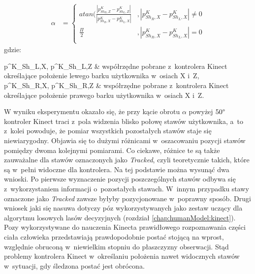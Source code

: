 \begin{equation}
	\label{eq:characteristics:kinect:bodyRotationAngle}
	\begin{split}
		\alpha &= 
		\begin{cases} 
			atan(\frac{|p^K_{{Sh}_R,Z} - p^K_{{Sh}_L,Z}|}{|p^K_{{Sh}_R,X} - p^K_{{Sh}_L,X}|} & , |p^K_{{Sh}_R,X} - p^K_{{Sh}_L,X}| \neq 0 \\
			\frac{\Pi}{2}                                                                    & , |p^K_{{Sh}_R,X} - p^K_{{Sh}_L,X}| = 0    \\		
		\end{cases}
	\end{split}
\end{equation}
gdzie:
\begin{conditions}
	p^K_{{Sh}_L,X}, p^K_{{Sh}_L,Z}			& współrzędne pobrane z~kontrolera Kinect określające położenie lewego barku użytkownika w~osiach X i~Z,\\
	p^K_{{Sh}_R,X}, p^K_{{Sh}_R,Z}			& współrzędne pobrane z~kontrolera Kinect określające położenie prawego barku użytkownika w~osiach X i~Z.\\
\end{conditions}
																																					
																																					
W wyniku eksperymentu okazało się, że przy kącie obrotu $\alpha$ powyżej $50\degree$ kontroler Kinect traci z~pola widzenia blisko połowę stawów użytkownika, a~to z~kolei powoduje, że pomiar wszystkich pozostałych stawów staje się niewiarygodny. Objawia się to dużymi różnicami w~oszacowaniu pozycji stawów pomiędzy dwoma kolejnymi pomiarami. Co ciekawe, różnice te są także zauważalne dla stawów oznaczonych jako \emph{Tracked}, czyli teoretycznie takich, które są w~pełni widoczne dla kontrolera. Na tej podstawie można wysunąć dwa wnioski. Po pierwsze wyznaczenie pozycji poszczególnych stawów odbywa się z~wykorzystaniem informacji o~pozostałych stawach. W~innym przypadku stawy oznaczone jako \emph{Tracked} zawsze byłyby pozycjonowane w~poprawny sposób. Drugi wniosek jaki się nasuwa dotyczy póz wykorzystywanych jako zestaw uczący dla algorytmu losowych lasów decyzyjnych (rozdział \ref{chap:humanModel:kinect}). Pozy wykorzystywane do nauczenia Kinecta prawidłowego rozpoznawania części ciała człowieka przedstawiają prawdopodobnie postać stojącą na wprost, względnie obruconą w~niewielkim stopniu do płaszczyzny obserwacji. Stąd problemy kontrolera Kinect w~określaniu położenia nawet widocznych stawów w~sytuacji, gdy śledzona postać jest obrócona.
																																					
